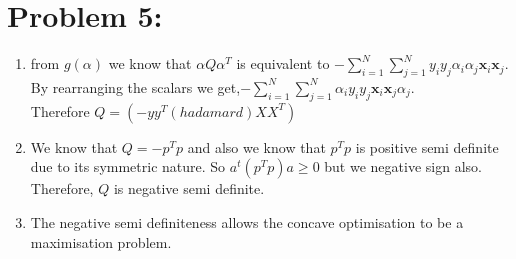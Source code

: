 \documentclass[5pt,a4paper]{article}
\begin{document}
	\section*{Problem 5:}
	\begin{enumerate}
		\item from $g(\alpha)$ we know that $\alpha Q\alpha^T$ is equivalent to $-\sum_{i=1}^{N}\sum_{j=1}^{N} y_i y_j \alpha_i \alpha_j \textbf{x}_i \textbf{x}_j$. By rearranging the scalars we get,$-\sum_{i=1}^{N}\sum_{j=1}^{N}\alpha_i  y_i y_j  \textbf{x}_i \textbf{x}_j \alpha_j$. \\Therefore $Q= (-yy^T(hadamard)XX^T)$		\item We know that $Q=-p^Tp$ and also we know that $p^Tp$ is positive semi definite due to its symmetric nature. So $a^t (p^Tp)a \geq 0$ but we negative sign also. Therefore, $Q$ is negative semi definite.
		\item The negative semi definiteness allows the concave optimisation to be a maximisation problem. 
	\end{enumerate}
	
\end{document}
